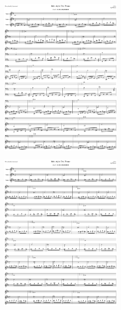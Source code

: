 \begin{figure}[H]                                             
{                                                             
  \setlength{\tabcolsep}{3.0pt}                               
  \setlength\cmidrulewidth{\heavyrulewidth} %
    \begin{subfigure}{0.5\textwidth}                            
  \includegraphics[width=6cm]{music/title_no_33_page_1001.png}%
    \end{subfigure}                                             
  \begin{subfigure}{0.5\textwidth}                            
  \includegraphics[width=6cm]{music/title_no_34_page_1001.png}%
    \end{subfigure}                                             
}                                                             
\end{figure}                                                  


